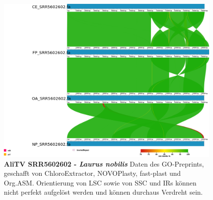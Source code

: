 \documentclass{scrartcl}
\begin{document}
\begin{figure}
\includegraphics[width=.9\linewidth]{./SRR5602602_1.png}
\caption[AliTV SRR5602602 - Laurus nobilis]{\textbf{AliTV SRR5602602 - \textit{Laurus nobilis}} Daten des GO-Preprints, geschafft von ChloroExtractor, NOVOPlasty, fast-plast und Org.ASM. Orientierung von LSC sowie von SSC und IRs können nicht perfekt aufgelöst werden und können durchaus Verdreht sein.}
\end{figure}
\end{document}
